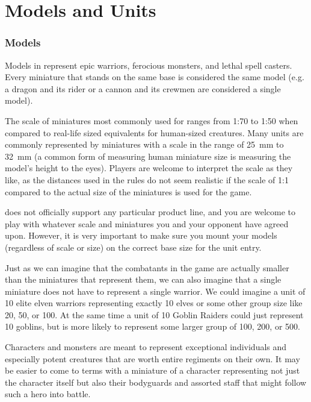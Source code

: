
\part{Models and Units}
\label{models_and_units}

\section{Models}
\label{models}

Models in \nameofthegame{} represent epic warriors, ferocious monsters, and lethal spell casters. Every miniature that stands on the same base is considered the same model (e.g. a dragon and its rider or a cannon and its crewmen are considered a single model).

The scale of miniatures most commonly used for \theninthage{} ranges from 1:70 to 1:50 when compared to real-life sized equivalents for human-sized creatures. Many units are commonly represented by miniatures with a scale in the range of \SI{25}{mm} to \SI{32}{mm} (a common form of measuring human miniature size is measuring the model's height to the eyes). Players are welcome to interpret the scale as they like, as the distances used in the rules do not seem realistic if the scale of 1:1 compared to the actual size of the miniatures is used for the game.

\theninthage{} does not officially support any particular product line, and you are welcome to play with whatever scale and miniatures you and your opponent have agreed upon. However, it is very important to make sure you mount your models (regardless of scale or size) on the correct base size for the unit entry.

Just as we can imagine that the combatants in the game are actually smaller than the miniatures that represent them, we can also imagine that a single miniature does not have to represent a single warrior. We could imagine a unit of 10 elite elven warriors representing exactly 10 elves or some other group size like 20, 50, or 100. At the same time a unit of 10 Goblin Raiders could just represent 10 goblins, but is more likely to represent some larger group of 100, 200, or 500.

Characters and monsters are meant to represent exceptional individuals and especially potent creatures that are worth entire regiments on their own. It may be easier to come to terms with a miniature of a character representing not just the character itself but also their bodyguards and assorted staff that might follow such a hero into battle.


